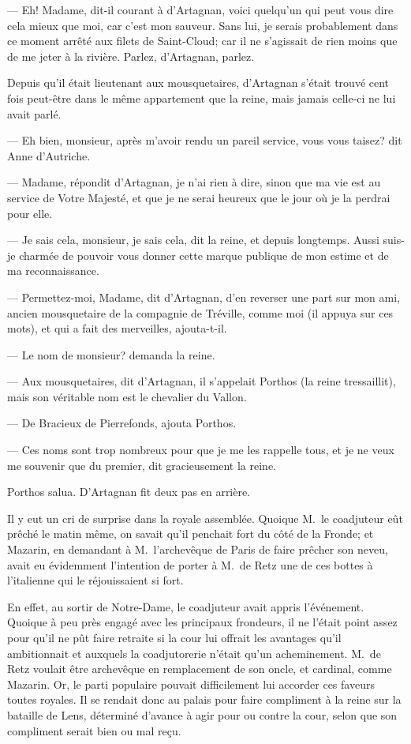 — Eh! Madame, dit-il courant à d'Artagnan, voici quelqu'un qui peut vous dire cela mieux que moi, car c'est mon sauveur. Sans lui, je serais probablement dans ce moment arrêté aux filets de Saint-Cloud; car il ne s'agissait de rien moins que de me jeter à la rivière. Parlez, d'Artagnan, parlez.

Depuis qu'il était lieutenant aux mousquetaires, d'Artagnan s'était trouvé cent fois peut-être dans le même appartement que la reine, mais jamais celle-ci ne lui avait parlé.

— Eh bien, monsieur, après m'avoir rendu un pareil service, vous vous taisez? dit Anne d'Autriche.

— Madame, répondit d'Artagnan, je n'ai rien à dire, sinon que ma vie est au service de Votre Majesté, et que je ne serai heureux que le jour où je la perdrai pour elle.

— Je sais cela, monsieur, je sais cela, dit la reine, et depuis longtemps. Aussi suis-je charmée de pouvoir vous donner cette marque publique de mon estime et de ma reconnaissance.

— Permettez-moi, Madame, dit d'Artagnan, d'en reverser une part sur mon ami, ancien mousquetaire de la compagnie de Tréville, comme moi (il appuya sur ces mots), et qui a fait des merveilles, ajouta-t-il.

— Le nom de monsieur? demanda la reine.

— Aux mousquetaires, dit d'Artagnan, il s'appelait Porthos (la reine tressaillit), mais son véritable nom est le chevalier du Vallon.

— De Bracieux de Pierrefonds, ajouta Porthos.

— Ces noms sont trop nombreux pour que je me les rappelle tous, et je ne veux me souvenir que du premier, dit gracieusement la reine.

Porthos salua. D'Artagnan fit deux pas en arrière.

Il y eut un cri de surprise dans la royale assemblée. Quoique M.~le coadjuteur eût prêché le matin même, on savait qu'il penchait fort du côté de la Fronde; et Mazarin, en demandant à M.~l'archevêque de Paris de faire prêcher son neveu, avait eu évidemment l'intention de porter à M.~de Retz une de ces bottes à l'italienne qui le réjouissaient si fort.

En effet, au sortir de Notre-Dame, le coadjuteur avait appris l'événement. Quoique à peu près engagé avec les principaux frondeurs, il ne l'était point assez pour qu'il ne pût faire retraite si la cour lui offrait les avantages qu'il ambitionnait et auxquels la coadjutorerie n'était qu'un acheminement. M.~de Retz voulait être archevêque en remplacement de son oncle, et cardinal, comme Mazarin. Or, le parti populaire pouvait difficilement lui accorder ces faveurs toutes royales. Il se rendait donc au palais pour faire compliment à la reine sur la bataille de Lens, déterminé d'avance à agir pour ou contre la cour, selon que son compliment serait bien ou mal reçu.

